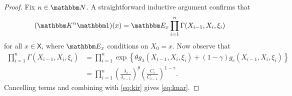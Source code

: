 \documentclass[12pt, reqno]{amsart}
\newcommand{\1}{\mathbbm 1}
\newcommand{\NN}{\mathbbm N}
\newcommand{\KK}{\mathbbm K}
\newcommand{\EE}{\mathbbm E}
\newcommand{\XX}{\mathsf X}
\theoremstyle{plain}
\theoremstyle{definition}
\begin{document}
\begin{proof}
    Fix $n \in \NN$.  A straightforward inductive argument confirms that
    \begin{equation}\label{eq:kir}
        (\KK^n \1)(x) = \EE_x \prod_{i=1}^n \Gamma(X_{i-1}, X_i, \xi_i)
    \end{equation}
    for all $x \in \XX$, where $\EE_x$ conditions on $X_0 = x$.  Now observe that
    \begin{align*}
        \prod_{i=1}^n \Gamma(X_{i-1}, X_i, \xi_i)
        & =
        \prod_{i=1}^n
        \exp
        \left\{ 
            \theta g_\lambda(X_{i-1}, X_i, \xi_i) + (1-\gamma)
            g_c(X_{i-1}, X_i, \xi_i)
        \right\}
        \\
        & =
        \prod_{i=1}^n
        \left( \frac{\lambda_i}{\lambda_{i-1}} \right)^\theta
        \left( \frac{C_i}{C_{i-1}} \right)^{1-\gamma} .
    \end{align*}
    Cancelling terms and combining with \eqref{eq:kir} gives \eqref{eq:knar}.
\end{proof}
\end{document}
